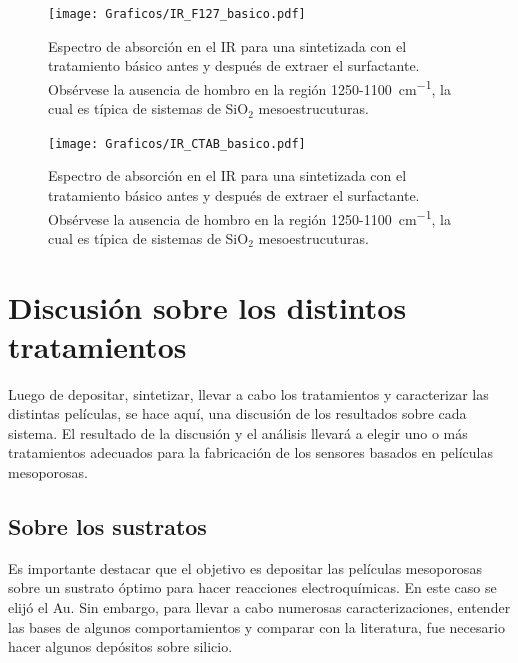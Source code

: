 {		\begin{figure}[!ht]
			\begin{center}
			\texttt{[image: Graficos/IR\_F127\_basico.pdf]}
			\caption[FTIR \pdmF\space tratamiento básico.]{Espectro de absorción en el IR para una \pdmF\space sintetizada con el tratamiento básico antes y después de extraer el surfactante. Obsérvese la ausencia de hombro en la región 1250-\SI{1100}{\cm^{-1}}, la cual es típica de sistemas de SiO$_2$ mesoestrucuturas.}
			\label{fig:IR_F127_basico}
			\end{center}
			\end{figure}

        \clearpage

		\begin{figure}[!ht]
			\begin{center}
			\texttt{[image: Graficos/IR\_CTAB\_basico.pdf]}
			\caption[FTIR \pdmC\space tratamiento básico.]{Espectro de absorción en el IR para una \pdmC\space sintetizada con el tratamiento básico antes y después de extraer el surfactante. Obsérvese la ausencia de hombro en la región 1250-\SI{1100}{\cm^{-1}}, la cual es típica de sistemas de SiO$_2$ mesoestrucuturas.}
			\label{fig:IR_CTAB_basico}
			\end{center}
			\end{figure}		

\section{Discusión sobre los distintos tratamientos}

		Luego de depositar, sintetizar, llevar a cabo los tratamientos y caracterizar las distintas películas, se hace aquí, una discusión de los resultados sobre cada sistema. El resultado de la discusión y el análisis llevará a elegir uno o más tratamientos adecuados para la fabricación de los sensores basados en películas mesoporosas.
 		
 	\subsection{Sobre los sustratos}
	
		Es importante destacar que el objetivo es depositar las películas mesoporosas sobre un sustrato óptimo para hacer reacciones electroquímicas. En este caso se elijó el Au. Sin embargo, para llevar a cabo numerosas caracterizaciones, entender las bases de algunos comportamientos y comparar con la literatura, fue necesario hacer algunos depósitos sobre silicio.

}
